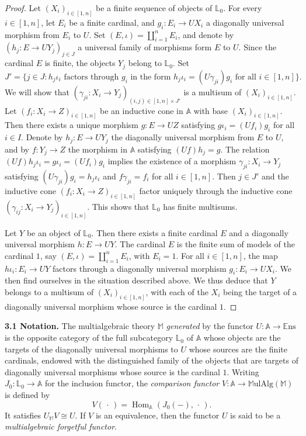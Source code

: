 \documentclass{article}
\newenvironment{rmenv}[1]
  {\phantomsection\par\medskip\noindent\textbf{#1.}\rmfamily}
  {\medskip}
\newcommand{\bb}[1]{{\mathbb{#1}}}
\newcommand{\Set}{\mathbb{E}\mathrm{ns}}
\newcommand{\MulAlg}{\mathbb{M}\mathrm{ulAlg}}
\DeclareMathOperator{\Hom}{Hom}
\newcommand{\oldpage}[1]{\marginpar{\footnotesize$\Big\vert$ \textit{p.~#1}}}
\begin{document}
\begin{proof}
  Let $(X_i)_{i\in[1,n]}$ be a finite sequence of objects of $\bb{L}_0$.
  For every $i\in[1,n]$, let $E_i$ be a finite cardinal, and $g_i\colon E_i\to UX_i$ a diagonally universal morphism from $E_i$ to $U$.
  Set $(E,\iota)=\coprod_{i=1}^nE_i$, and denote by $(h_j\colon E\to UY_j)_{j\in J}$ a universal family of morphisms form $E$ to $U$.
  Since the cardinal $E$ is finite, the objects $Y_j$ belong to $\bb{L}_0$.
  Set
  \[
    J' =
    \big\{
      j\in J
      :
      \mbox{$h_j\iota_i$ factors through $g_i$ in the form $h_j\iota_i=(U\gamma_{ji})g_i$ for all $i\in[1,n]$}
    \big\}.
  \]
  We will show that $(\gamma_{ji}\colon X_i\to Y_j)_{(i,j)\in[1,n]\times J'}$ is a multisum of $(X_i)_{i\in[1,n]}$.
  Let $(f_i\colon X_i\to Z)_{i\in[1,n]}$ be an inductive cone in $\bb{A}$ with base $(X_i)_{i\in[1,n]}$.
  Then there exists a unique morphism $g\colon E\to UZ$ satisfying $g\iota_i=(Uf_i)g_i$ for all $i\in I$.
  Denote by $h_j\colon E\to UY_j$ the diagonally universal morphism from $E$ to $U$, and by $f\colon Y_j\to Z$ the morphism in $\bb{A}$ satisfying $(Uf)h_j=g$.
  The relation $(Uf)h_j\iota_i=g\iota_i=(Uf_i)g_i$ implies the existence of a morphism $\gamma_{ji}\colon X_i\to Y_j$ satisfying $(U\gamma_{ji})g_i=h_j\iota_i$ and $f\gamma_{ji}=f_i$ for all $i\in[1,n]$.
  Then $j\in J'$ and the inductive cone $(f_i\colon X_i\to Z)_{i\in[1,n]}$ factor uniquely through the inductive cone $(\gamma_{ij}\colon X_i\to Y_j)_{i\in[1,n]}$.
  This shows that $\bb{L}_0$ has finite multisums.

  Let $Y$ be an object of $\bb{L}_0$.
  Then there exists a finite cardinal $E$ and a diagonally universal morphism $h\colon E\to UY$.
  The cardinal $E$ is the finite sum of models of the cardinal $1$,
\oldpage{201}
  say $(E,\iota)=\coprod_{i=1}^nE_i$, with $E_i=1$.
  For all $i\in[1,n]$, the map $h\iota_i\colon E_i\to UY$ factors through a diagonally universal morphism $g_i\colon E_i\to UX_i$.
  We then find ourselves in the situation described above.
  We thus deduce that $Y$ belongs to a multisum of $(X_i)_{i\in[1,n]}$, with each of the $X_i$ being the target of a diagonally universal morphism whose source is the cardinal $1$.
\end{proof}

\begin{rmenv}{3.1 Notation}
\label{3.1}
  The multialgebraic theory $\bb{M}$ \emph{generated} by the functor $U\colon\bb{A}\to\Set$ is the opposite category of the full subcategory $\bb{L}_0$ of $\bb{A}$ whose objects are the targets of the diagonally universal morphisms to $U$ whose sources are the finite cardinals, endowed with the distinguished family of the objects that are targets of diagonally universal morphisms whose source is the cardinal $1$.
  Writing $J_0\colon\bb{L}_0\to\bb{A}$ for the inclusion functor, the \emph{comparison functor} $V\colon\bb{A}\to\MulAlg(\bb{M})$ is defined by
  \[
    V(\,\cdot\,) = \Hom_\bb{A}(J_0(-),\,\cdot\,).
  \]
  It satisfies $U_\bb{M}V\cong U$.
  If $V$ is an equivalence, then the functor $U$ is said to be a \emph{multialgebraic forgetful functor}.
\end{rmenv}
\end{document}
